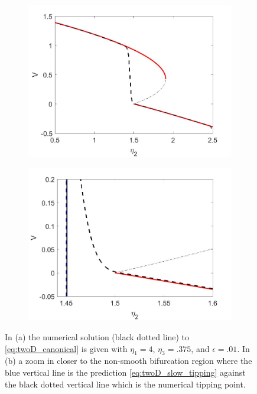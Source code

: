 \begin{figure}[H]
\centering
\begin{subfigure}{.5\textwidth}
  \centering
  \includegraphics[width=\linewidth]{twoD/slow_bif_diagram.jpg}
  \caption{}
\end{subfigure}%
\begin{subfigure}{.5\textwidth}
  \centering
  \includegraphics[width=\linewidth]{twoD/slow_bif_diagram_zoom.jpg}
  \caption{}
\end{subfigure}
\caption{In (a) the numerical solution (black dotted line) to \eqref{eq:twoD_canonical} is given with $\eta_1=4$, $\eta_3=.375$, and $\epsilon=.01$. In (b) a zoom in closer to the non-smooth bifurcation region where the blue vertical line is the prediction \eqref{eq:twoD_slow_tipping} against the black dotted vertical line which is the numerical tipping point.}
\label{fig:twoD_slow_Vnumerics}
\end{figure}

